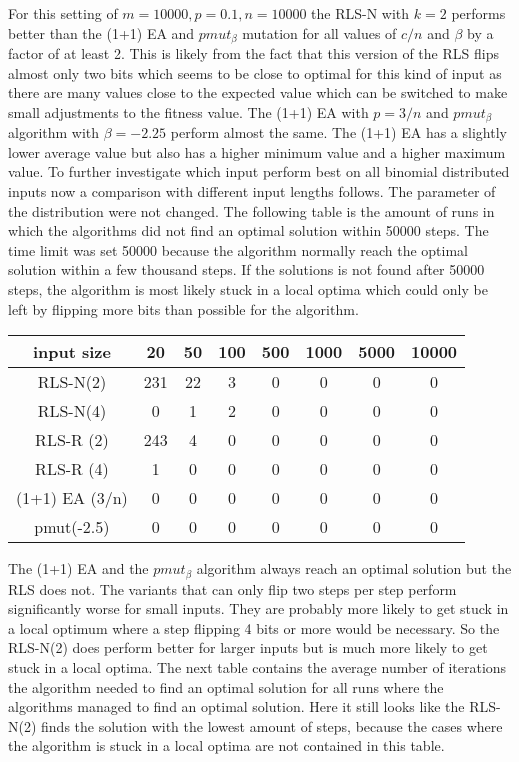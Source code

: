 For this setting of $m=10000, p=0.1, n=10000$ the RLS-N with $k=2$ performs better than the  (1+1) EA and $pmut_\beta$ mutation for all values of $c/n$ and $\beta$ by a factor of at least 2.
This is likely from the fact that this version of the RLS flips almost only two bits which seems to be close to optimal for this kind of input as there are many values close to the expected value which can be switched to make small adjustments to the fitness value.
The (1+1) EA with $p=3/n$ and $pmut_\beta$ algorithm with $\beta=-2.25$ perform almost the same.
The (1+1) EA has a slightly lower average value but also has a higher minimum value and a higher maximum value.
To further investigate which input perform best on all binomial distributed inputs now a comparison with different input lengths follows. The parameter of the distribution were not changed.
The following table is the amount of runs in which the algorithms did not find an optimal solution within 50000 steps.
The time limit was set 50000 because the algorithm normally reach the optimal solution within a few thousand steps.
If the solutions is not found after 50000 steps, the algorithm is most likely stuck in a local optima which could only be left by flipping more bits than possible for the algorithm.

\begin{tabular}{cccccccc}
      input size     & 20  & 50 & 100 & 500 & 1000 & 5000 & 10000 \\\hline
      RLS-N(2)       & 231 & 22 & 3   & 0   & 0    & 0    & 0     \\
      RLS-N(4)       & 0   & 1  & 2   & 0   & 0    & 0    & 0     \\
      RLS-R (2)      & 243 & 4  & 0   & 0   & 0    & 0    & 0     \\
      RLS-R (4)      & 1   & 0  & 0   & 0   & 0    & 0    & 0     \\
      (1+1) EA (3/n) & 0   & 0  & 0   & 0   & 0    & 0    & 0     \\
      pmut(-2.5)     & 0   & 0  & 0   & 0   & 0    & 0    & 0     \\
\end{tabular}

The (1+1) EA and the $pmut_\beta$ algorithm always reach an optimal solution but the RLS does not.
The variants that can only flip two steps per step perform significantly worse for small inputs.
They are probably more likely to get stuck in a local optimum where a step flipping 4 bits or more would be necessary.
So the RLS-N(2) does perform better for larger inputs but is much more likely to get stuck in a local optima.
The next table contains the average number of iterations the algorithm needed to find an optimal solution for all runs where the algorithms managed to find an optimal solution.
Here it still looks like the RLS-N(2) finds the solution with the lowest amount of steps, because the cases where the algorithm is stuck in a local optima are not contained in this table.

